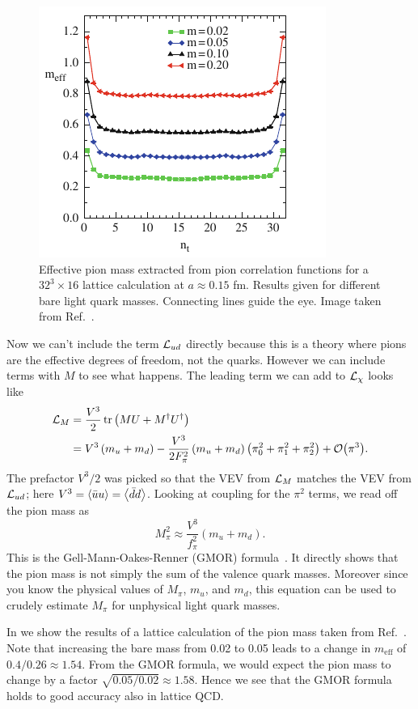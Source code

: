 \begin{figure}
\centering
\includegraphics[width=0.5\linewidth]{figs/GMOR.pdf}
\caption{Effective pion mass extracted from pion correlation functions
for a $32^3\times16$ lattice calculation at $a\approx0.15$ fm.
Results given for different bare light quark masses. Connecting lines guide the
eye. Image taken from Ref.~\cite{gattringer_quantum_2010}.}
\label{fig:GMOR}
\end{figure}

Now we can't include the term $\mathcal{L}_{ud}$ directly because this is a theory
where pions are the effective degrees of freedom, not the quarks. However we can
include terms with $M$ to see what happens. The leading term we can add to
$\mathcal{L}_\chi$ looks like
\begin{equation}
\begin{aligned}
\Lagr_M & =\frac{V^3}{2} \operatorname{tr}\left(M U+M^{\dagger} U^{\dagger}\right) \\
& =V^3\left(m_u+m_d\right)-\frac{V^3}{2
F_\pi^2}\left(m_u+m_d\right)\left(\pi_0^2+\pi_1^2+\pi_2^2\right)+\order{\pi^3} .
\end{aligned}
\end{equation}
The prefactor $V^3/2$ was picked so that the VEV from $\mathcal{L}_M$ matches the VEV
from $\mathcal{L}_{ud}$; here $V^3=\ev{\bar{u}u}=\ev{\bar{d}d}$. Looking at coupling
for the $\pi^2$ terms, we read off the pion mass as
\begin{equation}
  M_\pi^2\approx \frac{V^3}{f_\pi^2}(m_u+m_d).
\end{equation}
This is the Gell-Mann-Oakes-Renner (GMOR)
formula~\cite{gell-mann_behavior_1968}.
It directly shows that the pion mass is not simply the sum of
the valence quark masses. Moreover since you know the physical values
of $M_\pi$, $m_u$, and $m_d$, this equation can be used to crudely estimate
$M_\pi$ for unphysical light quark masses.

In  we show the results of a lattice calculation of the pion
mass taken from Ref.~\cite{gattringer_quantum_2010}. Note that increasing the
bare mass from 0.02 to 0.05 leads to a change in $m_\text{eff}$ of
$0.4/0.26\approx1.54$. From the GMOR formula, we would expect the pion mass to
change by a factor $\sqrt{0.05/0.02}\approx1.58$. Hence we see that the GMOR
formula holds to good accuracy also in lattice QCD.


